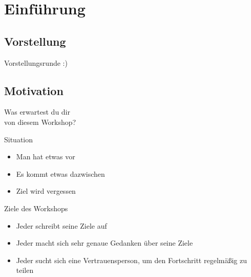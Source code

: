 \section{Einführung}

\subsection{Vorstellung}

\addtocounter{framenumber}{1}
\begin{frame}[standout]
    \LARGE
    Vorstellungsrunde :)
\end{frame}


\subsection{Motivation}


\addtocounter{framenumber}{1}
\begin{frame}[standout]
    \LARGE
    Was erwartest du dir \\
    von diesem Workshop?
\end{frame}


\begin{frame}[c]{Situation}
    \Large
    \begin{itemize}[<+(1)->]
        \item Man hat etwas vor
        \item Es kommt etwas dazwischen
        \item Ziel wird vergessen
    \end{itemize}
\end{frame}

\begin{frame}[c]{Ziele des Workshops}
    \large
    \begin{itemize}[<+(1)->]
        \item Jeder schreibt seine Ziele auf
        \item Jeder macht sich sehr genaue Gedanken über seine Ziele
        \item Jeder sucht sich eine Vertrauensperson, um den Fortschritt regelmäßig zu teilen
    \end{itemize}
\end{frame}




